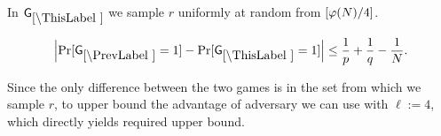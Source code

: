 %
%

In $\games_\thisgame$ we sample $r$ uniformly at random from $[\varphi(N)/4]$. 
\begin{lemma}
\[
\left|\Pr[\games_\prevgame = 1] - \Pr[\games_\thisgame = 1]\right| \leq \frac{1}{p}+\frac{1}{q}-\frac{1}{N}.
\]
\end{lemma}
Since the only difference between the two games is in the set from which we sample $r$, to upper bound the advantage of adversary we can use  with $\ell:=4$, which directly yields required upper bound.

